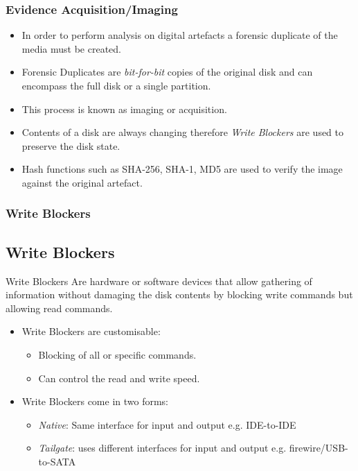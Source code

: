 \documentclass{beamer}
\begin{document}
\begin{frame}
	\frametitle{Evidence Acquisition/Imaging}
	\begin{itemize}
		\item In order to perform analysis on digital artefacts a forensic duplicate of the media must be created.
		\item Forensic Duplicates are \emph{bit-for-bit} copies of the original disk and can encompass the full disk or a single partition. 
		\item This process is known as imaging or acquisition.
		\item Contents of a disk are always changing therefore \emph{Write Blockers} are used to preserve the disk state.
		\item Hash functions such as SHA-256, SHA-1, MD5 are used to verify the image against the original artefact.
	\end{itemize}
\end{frame}

\begin{frame}
	\frametitle{Write Blockers}
	\subsection*{Write Blockers}
	\begin{block}{Write Blockers}
			Are hardware or software devices that allow gathering of information without damaging the disk contents by blocking write commands but allowing read commands.
	\end{block}
	\begin{itemize}
		\item Write Blockers are customisable:
			\begin{itemize}
				\item Blocking of all or specific commands.
				\item Can control the read and write speed.
			\end{itemize}
		\item Write Blockers come in two forms:
			\begin{itemize}
				\item \emph{Native}: Same interface for input and output e.g. IDE-to-IDE
				\item \emph{Tailgate}: uses different interfaces for input and output e.g. firewire/USB-to-SATA
			\end{itemize}
		\end{itemize}
\end{frame}
\end{document}
